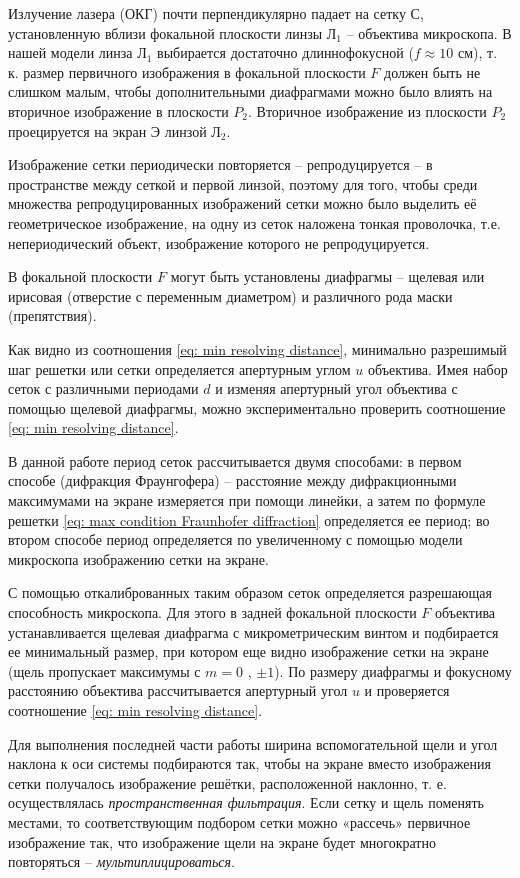 \documentclass[a4paper,12pt]{article}
\begin{document}
Излучение лазера (ОКГ) почти перпендикулярно падает на сетку $С$, установленную вблизи фокальной плоскости линзы $Л_1$ -- объектива микроскопа. В нашей модели линза $Л_1$ выбирается достаточно длиннофокусной ($f \approx 10 $ см), т. к. размер первичного изображения в фокальной плоскости $F$ должен быть не слишком малым, чтобы дополнительными диафрагмами можно было влиять на вторичное изображение в плоскости $P_2$. Вторичное изображение из плоскости $P_2$ проецируется на экран $Э$ линзой $Л_2$.

Изображение сетки периодически повторяется -- $репродуцируется$ -- в пространстве между сеткой и первой линзой, поэтому для того, чтобы среди множества репродуцированных изображений сетки можно было выделить её геометрическое изображение, на одну из сеток наложена тонкая проволочка, т.е. непериодический объект, изображение которого не репродуцируется.

В фокальной плоскости $F$ могут быть установлены диафрагмы -- щелевая или ирисовая (отверстие с переменным диаметром) и различного рода маски (препятствия).

Как видно из соотношения \eqref{eq: min resolving distance}, минимально разрешимый шаг решетки или сетки определяется апертурным углом $u$ объектива. Имея набор сеток с различными периодами $d$ и изменяя апертурный угол объектива с помощью щелевой диафрагмы, можно экспериментально проверить соотношение \eqref{eq: min resolving distance}.

В данной работе период сеток рассчитывается двумя способами: в первом способе (дифракция Фраунгофера) -- расстояние между дифракционными максимумами на экране измеряется при помощи линейки, а затем по формуле решетки \eqref{eq: max condition Fraunhofer diffraction} определяется ее период; во втором способе период определяется по увеличенному с помощью модели микроскопа изображению сетки на экране. 

С помощью откалиброванных таким образом сеток определяется разрешающая способность микроскопа. Для этого в задней фокальной плоскости $F$ объектива устанавливается щелевая диафрагма с микрометрическим винтом и подбирается ее минимальный размер, при котором еще видно изображение сетки на экране (щель пропускает максимумы с $m = 0$ , $ \pm 1$). По размеру диафрагмы и фокусному расстоянию объектива рассчитывается апертурный угол $u$ и проверяется соотношение \eqref{eq: min resolving distance}.

Для выполнения последней части работы ширина вспомогательной щели и угол наклона к оси системы подбираются так, чтобы на экране вместо изображения сетки получалось изображение решётки, расположенной наклонно, т. е. осуществлялась \textit{пространственная фильтрация}. Если сетку и щель поменять местами, то соответствующим подбором сетки можно «рассечь» первичное изображение так, что изображение щели на экране будет многократно повторяться -- \textit{мультиплицироваться}.
\end{document}
